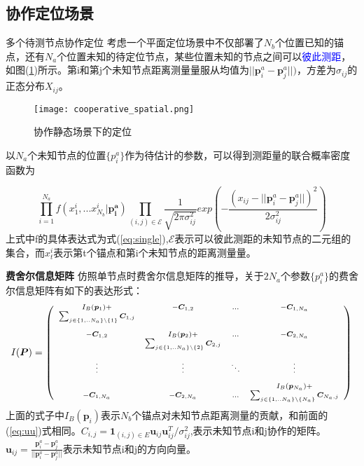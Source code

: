 \subsection[协作定位场景]{协作定位场景}

{多个待测节点协作定位}
考虑一个平面定位场景中不仅部署了$N_b$个位置已知的锚点，还有$N_a$个位置未知的待定位节点，某些位置未知的节点之间可以\textcolor{blue}{彼此测距}，如图(\ref{fig:cooperative_spatial})所示。第i和第j个未知节点距离测量量服从均值为$||\bm{p}^a_i-\bm{p}^a_j||)$，方差为$\sigma_{ij}$的正态分布$X_{ij}$。
        \begin{figure}
          \centering
          \texttt{[image: cooperative\_spatial.png]}
          \caption{协作静态场景下的定位}\label{fig:cooperative_spatial}
        \end{figure}

以$N_a$个未知节点的位置$\{p_i^a\}$作为待估计的参数，可以得到测距量的联合概率密度函数为

\begin{equation}
\prod_{i=1}^{N_a} f(x^i_1,...x^{i}_{N_b}|\bm{p^a_i})\prod_{(i,j)\in \mathcal{E}}\frac{1}{\sqrt{2\pi\sigma_{ij}^2}}exp(-\frac{(x_{ij}-||\bm{p}^a_i-\bm{p}^a_j||)^2}{2\sigma_{ij}^2})
\end{equation}
上式中f的具体表达式为式(\ref{eq:single}),$\mathcal{E}$表示可以彼此测距的未知节点的二元组的集合，而$x_t^i$表示第t个锚点和第i个未知节点的距离测量量。

\textbf{费舍尔信息矩阵}
仿照单节点时费舍尔信息矩阵的推导，关于$2N_a$个参数$\{p_i^a\}$的费舍尔信息矩阵有如下的表达形式：
\begin{equation}
\scriptsize{
I(\bm{P})=
\left(
\begin{array}{cccc}
I_B(\bm{p}_1)+&-\bm{C}_{1,2}&...&-\bm{C}_{1,N_a}\\
\sum_{j\in \{1,..N_a\}\backslash\{1\}}\bm{C}_{1,j}&&&\\
&&&\\
-\bm{C}_{1,2} & I_B(\bm{p}_2)+
&...&-\bm{C}_{2,N_a}\\
&\sum_{j\in \{1,..N_a\}\backslash \{2\}}\bm{C}_{2,j}&&\\
&&&\\
\vdots &\vdots&\ddots &\vdots\\
&&&\\
&&&I_B(\bm{p}_{N_a})+\\
-\bm{C}_{1,N_a}&-\bm{C}_{2,N_a}&...& \sum_{j\in \{1,..N_a\}\backslash\{N_a\}}\bm{C}_{N_a,j}\\
\end{array}
\right)
}
\end{equation}
上面的式子中$I_B(\bm{p}_i)$表示$N_b$个锚点对未知节点距离测量的贡献，和前面的(\ref{eq:uu})式相同。$C_{i,j}=\bm{1}_{(i,j)\in E}\bm{u}_{ij}\bm{u}_{ij}^T/\sigma^2_{ij}$,表示未知节点i和j协作的矩阵。
$\bm{u}_{ij}=\frac{\bm{p}^a_i-\bm{p}^a_j}{||\bm{p}^a_i-\bm{p}^a_j||}$表示未知节点i和j的方向向量。
